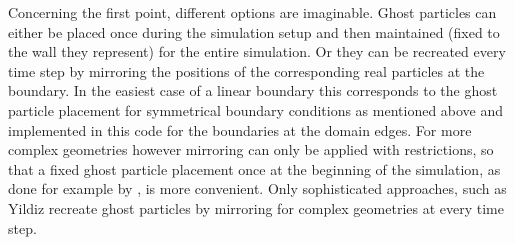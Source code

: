 \documentclass[11pt,a4paper,twoside]{report}
\begin{document}
Concerning the first point, different options are imaginable. Ghost particles can either be placed once during the simulation setup and then maintained (fixed to the wall they represent) for the entire simulation. Or they can be recreated every time step by mirroring the positions of the corresponding real particles at the boundary. In the easiest case of a linear boundary this corresponds to the ghost particle placement for symmetrical boundary conditions as mentioned above and implemented in this code for the boundaries at the domain edges.
For more complex geometries however mirroring can only be applied with restrictions, so that a fixed ghost particle placement once at the beginning of the simulation, as done for example by \cite{Morris1997, Zhu1999}, is more convenient. Only sophisticated approaches, such as Yildiz \cite{Yildiz2009} recreate ghost particles by mirroring for complex geometries at every time step.
\end{document}
